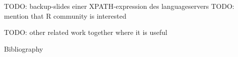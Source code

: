 


\titleframe

% 

% 

% 






\begin{frame}
   TODO: backup-slides einer XPATH-expression des languageservers
   TODO: mention that R community is interested
\end{frame}
\begin{frame}
TODO: other related work together where it is useful
\end{frame}




\begin{frame}{Bibliography}
   \printBibCommand
\end{frame}

